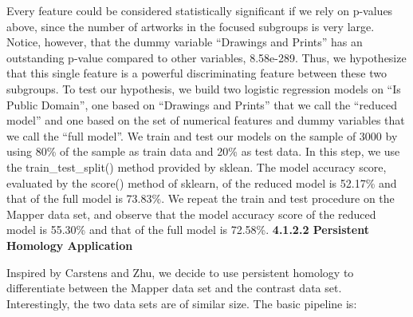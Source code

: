 \documentclass[12pt]{article}
\theoremstyle{definition}
\begin{document}
\begin{table}[htbp]
        \centering
        \caption{Results for proportion test. Features 1-9 correspond to: American Decorative Arts, Arms and Armor, European Sculpture and Decorative Arts, Drawings and Prints, Photographs, Arts of Africa, Oceania, and the Americas, Robert Lehman Collection, The Cloisters, Modern and Contemporary Art}
        \label{tab2}
    \end{table}
Every feature could be considered statistically significant if we rely on p-values above, since the number of artworks in the focused subgroups is very large. Notice, however, that the dummy variable ``Drawings and Prints'' has an outstanding p-value compared to other variables, 8.58e-289. Thus, we hypothesize that this single feature is a powerful discriminating feature between these two subgroups. To test our hypothesis, we build two logistic regression models on ``Is Public Domain'', one based on ``Drawings and Prints'' that we call the ``reduced model'' and one based on the set of numerical features and dummy variables that we call the ``full model''. We train and test our models on the sample of 3000 by using 80\% of the sample as train data and 20\% as test data. In this step, we use the train_test_split() method provided by sklean\cite{scikit-learn}. The model accuracy score, evaluated by the score() method of sklearn\cite{scikit-learn}, of the reduced model is 52.17\% and that of the full model is 73.83\%. We repeat the train and test procedure on the Mapper data set, and observe that the model accuracy score of the reduced model is 55.30\% and that of the full model is 72.58\%. 
\bigbreak
\bigbreak
\noindent\textbf{4.1.2.2 Persistent Homology Application}
\newline
\par Inspired by Carstens\cite{weights} and Zhu\cite{zhu2013language}, we decide to use persistent homology to differentiate between the Mapper data set and the contrast data set. Interestingly, the two data sets are of similar size. The basic pipeline is: 
\end{document}

